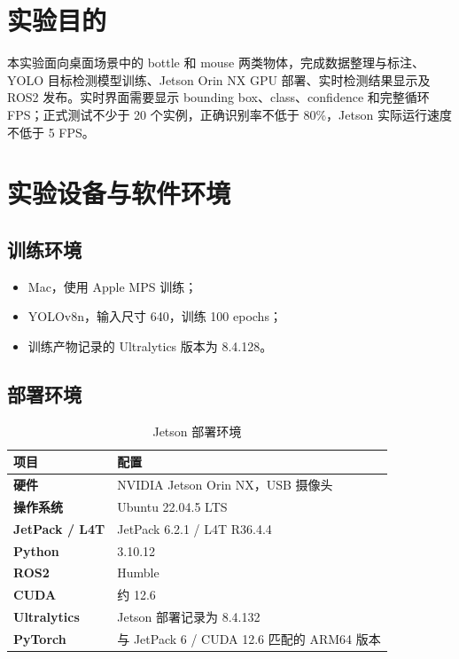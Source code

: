 \documentclass[UTF8,fontset=fandol,a4paper,12pt]{ctexart}
\begin{document}
\section{实验目的}

本实验面向桌面场景中的 bottle 和 mouse 两类物体，完成数据整理与标注、YOLO 目标检测模型训练、Jetson Orin NX GPU 部署、实时检测结果显示及 ROS2 发布。实时界面需要显示 bounding box、class、confidence 和完整循环 FPS；正式测试不少于 20 个实例，正确识别率不低于 80\%，Jetson 实际运行速度不低于 5 FPS。

\section{实验设备与软件环境}

\subsection{训练环境}

\begin{itemize}
  \item Mac，使用 Apple MPS 训练；
  \item YOLOv8n，输入尺寸 640，训练 100 epochs；
  \item 训练产物记录的 Ultralytics 版本为 8.4.128。
\end{itemize}

\subsection{部署环境}

\begin{table}[H]
\centering
\caption{Jetson 部署环境}
\begin{tabularx}{0.9\textwidth}{>{\bfseries}l X}
\toprule
项目 & 配置 \\
\midrule
硬件 & NVIDIA Jetson Orin NX，USB 摄像头 \\
操作系统 & Ubuntu 22.04.5 LTS \\
JetPack / L4T & JetPack 6.2.1 / L4T R36.4.4 \\
Python & 3.10.12 \\
ROS2 & Humble \\
CUDA & 约 12.6 \\
Ultralytics & Jetson 部署记录为 8.4.132 \\
PyTorch & 与 JetPack 6 / CUDA 12.6 匹配的 ARM64 版本 \\
\bottomrule
\end{tabularx}
\end{table}
\end{document}

